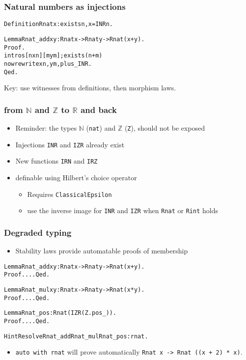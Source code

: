 \documentclass[compress]{beamer}
\begin{document}
\begin{frame}[fragile]
\frametitle{Natural numbers as injections}
\begin{alltt}
Definition Rnat x : exists n, x = INR n.

Lemma  Rnat_add x y : Rnat x -> Rnat y -> Rnat (x + y).
Proof.
intros [n xn] [m ym]; exists (n + m)%nat.
now rewrite xn, ym, plus_INR.
Qed.
\end{alltt}
Key: use witnesses from definitions, then morphism laws.
\end{frame}
\begin{frame}
\frametitle{from \(\mathbb N\) and \(\mathbb Z\) to \(\mathbb R\) and back}
\begin{itemize}
\item Reminder: the types \(\mathbb N\) ({\tt nat}) and \(\mathbb Z\) ({\tt Z}),
should not be exposed
\item Injections {\tt INR} and {\tt IZR} already exist
\item New functions {\tt IRN} and {\tt IRZ}
\item definable using Hilbert's choice operator
\begin{itemize}
\item Requires {\tt ClassicalEpsilon}
\item use the inverse image for {\tt INR} and {\tt IZR} when {\tt Rnat}
or {\tt Rint} holds
\end{itemize}
\end{itemize}
\end{frame}
\begin{frame}[fragile]
\frametitle{Degraded typing}
\begin{itemize}
\item Stability laws provide automatable proofs of membership
\end{itemize}
\begin{alltt}
Lemma Rnat_add x y : Rnat x -> Rnat y -> Rnat (x + y).
Proof. ... Qed.

Lemma Rnat_mul x y : Rnat x -> Rnat y -> Rnat (x * y).
Proof. ... Qed.

Lemma Rnat_pos : Rnat (IZR (Z.pos _)).
Proof. ... Qed.

Hint Resolve Rnat_add Rnat_mul Rnat_pos : rnat.
\end{alltt}
\begin{itemize}
\item {\tt auto with rnat} will prove automatically
   {\tt Rnat x -> Rnat ((x + 2) * x)}.
\end{itemize}
\end{frame}
\end{document}
